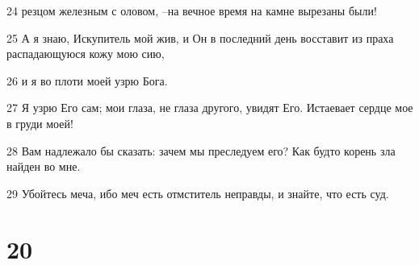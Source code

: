 \par 24 резцом железным с оловом, --на вечное время на камне вырезаны были!
\par 25 А я знаю, Искупитель мой жив, и Он в последний день восставит из праха распадающуюся кожу мою сию,
\par 26 и я во плоти моей узрю Бога.
\par 27 Я узрю Его сам; мои глаза, не глаза другого, увидят Его. Истаевает сердце мое в груди моей!
\par 28 Вам надлежало бы сказать: зачем мы преследуем его? Как будто корень зла найден во мне.
\par 29 Убойтесь меча, ибо меч есть отмститель неправды, и знайте, что есть суд.

\chapter{20}

